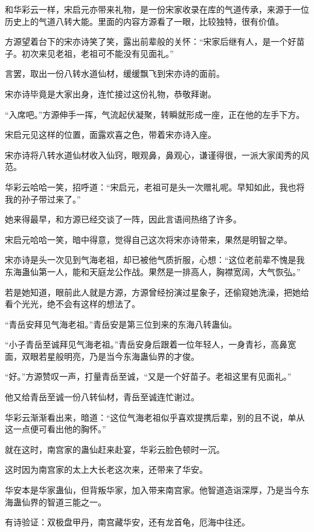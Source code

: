 \begin{this_body}
和华彩云一样，宋启元亦带来礼物，是一份宋家收录在库的气道传承，来源于一位历史上的气道八转大能。里面的内容方源看了一眼，比较独特，很有价值。

方源望着台下的宋亦诗笑了笑，露出前辈般的关怀：“宋家后继有人，是一个好苗子。初次来见老祖，老祖可不能没有见面礼。”

言罢，取出一份八转水道仙材，缓缓飘飞到宋亦诗的面前。

宋亦诗毕竟是大家出身，连忙接过这份礼物，恭敬拜谢。

“入席吧。”方源伸手一挥，气流起伏凝聚，转瞬就形成一座，正在他的左手下方。

宋启元见这样的位置，面露欢喜之色，带着宋亦诗入座。

宋亦诗将八转水道仙材收入仙窍，眼观鼻，鼻观心，谦谨得很，一派大家闺秀的风范。

华彩云哈哈一笑，招呼道：“宋启元，老祖可是头一次赠礼呢。早知如此，我也将我的孙子带过来了。”

她来得最早，和方源已经交谈了一阵，因此言语间热络了许多。

宋启元哈哈一笑，暗中得意，觉得自己这次将宋亦诗带来，果然是明智之举。

宋亦诗是头一次见到气海老祖，却已被他气质折服，心想：“这位老前辈不愧是我东海蛊仙第一人，能和天庭龙公作战。果然是一排高人，胸襟宽阔，大气恢弘。”

若是她知道，眼前此人就是方源，方源曾经扮演过星象子，还偷窥她洗澡，把她给看个光光，绝不会有这样的想法了。

“青岳安拜见气海老祖。”青岳安是第三位到来的东海八转蛊仙。

“小子青岳至诚拜见气海老祖。”青岳安身后跟着一位年轻人，一身青衫，高鼻宽面，双眼若星般明亮，乃是当今东海蛊仙界的才俊。

“好。”方源赞叹一声，打量青岳至诚，“又是一个好苗子。老祖这里有见面礼。”

他又给青岳至诚一份八转仙材，青岳至诚连忙谢过。

华彩云渐渐看出来，暗道：“这位气海老祖似乎喜欢提携后辈，别的且不说，单从这一点便可看出他的胸怀。”

就在这时，南宫家的蛊仙赶来赴宴，华彩云脸色顿时一沉。

这时因为南宫家的太上大长老这次来，还带来了华安。

华安本是华家蛊仙，但背叛华家，加入带来南宫家。他智道造诣深厚，乃是当今东海蛊仙界的智道三能之一。

有诗验证：双极盘甲丹，南宫藏华安，还有龙首龟，厄海中往还。


\end{this_body}
